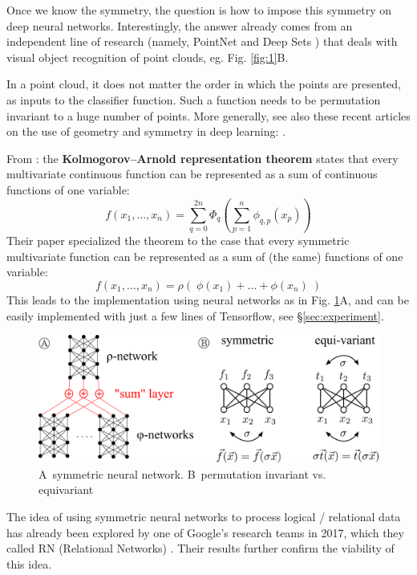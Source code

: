 \documentclass[orivec]{llncs}
\newcommand{\circA}{\textcircled{\scriptsize{A}} \,}
\newcommand{\circB}{\textcircled{\scriptsize{B}} \,}
\begin{document}
Once we know the symmetry, the question is how to impose this symmetry on deep neural networks.  Interestingly, the answer already comes from an independent line of research (namely, PointNet \cite{Qi2017a} and Deep Sets \cite{Zaheer2017a}) that deals with visual object recognition of point clouds, eg. Fig. \ref{fig:1}B.

In a point cloud, it does not matter the order in which the points are presented, as inputs to the classifier function.  Such a function needs to be permutation invariant to a huge number of points.  More generally, see also these recent articles on the use of geometry and symmetry in deep learning: \cite{Bronstein2021} \cite{Bronstein2021a}.

From \cite{Zaheer2017a}: the \textbf{Kolmogorov–Arnold representation theorem} states that every multivariate continuous function can be represented as a sum of continuous functions of one variable:
\begin{equation}
f(x_1,... ,x_n) = \sum_{q=0}^{2n}\Phi_{q} \left(\sum_{p=1}^n \phi_{q,p}(x_p) \right)
\end{equation}
Their paper specialized the theorem to the case that every symmetric multivariate function can be represented as a sum of (the same) functions of one variable:
\begin{equation}
\label{symmetric-functions}
f(x_1, ..., x_n) = \rho(\; \phi(x_1) + ... + \phi(x_n) \;)
\end{equation}
This leads to the implementation using neural networks as in Fig. \ref{fig:symmetric}A, and can be easily implemented with just a few lines of Tensorflow, see \S\ref{sec:experiment}.

\begin{figure}
	\centering
	\includegraphics[scale=0.5]{symmetric.png}
	\caption{\circA symmetric neural network. \circB permutation invariant vs. equivariant}
	\label{fig:symmetric}
\end{figure}

The idea of using symmetric neural networks to process logical / relational data has already been explored by one of Google's research teams in 2017, which they called RN (Relational Networks) \cite{Santoro2017} \cite{Battaglia2018}.  Their results further confirm the viability of this idea.
\end{document}
